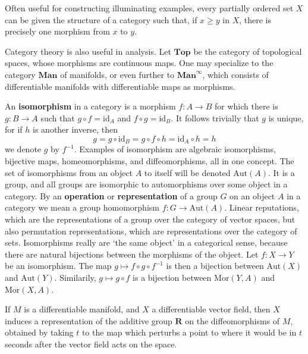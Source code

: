 \begin{example}
    Often useful for constructing illuminating examples, every partially ordered set $X$ can be given the structure of a category such that, if $x \geq y$ in $X$, there is precisely one morphism from $x$ to $y$.
\end{example}

\begin{example}
    Category theory is also useful in analysis. Let $\mathbf{Top}$ be the category of topological spaces, whose morphisms are continuous maps. One may specialize to the category $\mathbf{Man}$ of manifolds, or even further to $\mathbf{Man}^\infty$, which consists of differentiable manifolds with differentiable maps as morphisms.
\end{example}

An {\bf isomorphism} in a category is a morphism $f:A \to B$ for which there is $g: B \to A$ such that $g \circ f = \text{id}_A$ and $f \circ g = \text{id}_B$. It follows trivially that $g$ is unique, for if $h$ is another inverse, then
%
\[ g = g \circ \text{id}_B = g \circ f \circ h = \text{id}_A \circ h = h \]
%
we denote $g$ by $f^{-1}$. Examples of isomorphism are algebraic isomorphisms, bijective maps, homeomorphisms, and diffeomorphisms, all in one concept. The set of isomorphisms from an object $A$ to itself will be denoted $\text{Aut}(A)$. It is a group, and all groups are isomorphic to automorphisms over some object in a category. By an {\bf operation} or {\bf representation} of a group $G$ on an object $A$ in a category we mean a group homomorphism $f: G \to \text{Aut}(A)$. Linear reputations, which are the representations of a group over the category of vector spaces, but also permutation representations, which are representations over the category of sets. Isomorphisms really are `the same object' in a categorical sense, because there are natural bijections between the morphisms of the object. Let $f: X \to Y$ be an isomorphism. The map $g \mapsto f \circ g \circ f^{-1}$ is then a bijection between $\text{Aut}(X)$ and $\text{Aut}(Y)$. Similarily, $g \mapsto g \circ f$ is a bijection between $\text{Mor}(Y,A)$ and $\text{Mor}(X,A)$.

\begin{example}
    If $M$ is a differentiable manifold, and $X$ a differentiable vector field, then $X$ induces a representation of the additive group $\mathbf{R}$ on the diffeomorphisms of $M$, obtained by taking $t$ to the map which perturbs a point to where it would be in $t$ seconds after the vector field acts on the space.
\end{example}

